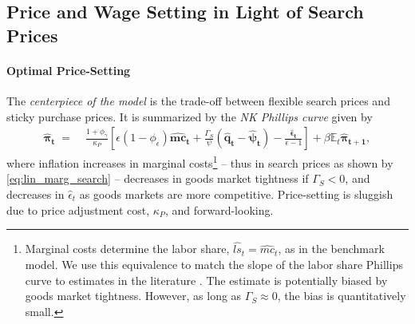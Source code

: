 \documentclass[12pt,3p,authoryear,review]{elsarticle}
\begin{document}
\subsection{Price and Wage Setting in Light of Search Prices}%
\paragraph{Optimal Price-Setting}%
The \emph{centerpiece of the model} is the trade-off between flexible search prices and sticky purchase prices. It is summarized by the \emph{NK Phillips curve} given by%
\begin{align}\label{eq:lin_nkpc}%
	\boldsymbol{\hat{\pi}_t} \; = & \; \frac{1+\phi_\gamma}{\kappa_P} \left[ \epsilon\left(1-\phi_\epsilon\right) \boldsymbol{\hat{mc}_t} + \frac{\Gamma_S}{\psi} \left(\boldsymbol{\hat{q}_t}-\boldsymbol{\hat{\psi}_t}\right) - \frac{\boldsymbol{\hat{\epsilon}_t}}{\epsilon-1} \right] + \beta \mathbb{E}_t \boldsymbol{\hat{\pi}_{t+1}},%
\end{align}%
where inflation increases in marginal costs\footnote{Marginal costs determine the labor share, $\hat{ls}_t = \hat{mc}_t$, as in the benchmark model. We use this equivalence to match the slope of the labor share Phillips curve to estimates in the literature \citep{galiInflationDynamicsStructural1999,sbordonePricesUnitLabor2002}. The estimate is potentially biased by goods market tightness. However, as long as $\Gamma_S \approx 0$, the bias is quantitatively small.} -- thus in search prices as shown by \eqref{eq:lin_marg_search} -- decreases in goods market tightness if $\Gamma_S<0$, and decreases in $\hat{\epsilon}_t$ as goods markets are more competitive. Price-setting is sluggish due to price adjustment cost, $\kappa_P$, and forward-looking.\\%
\end{document}
